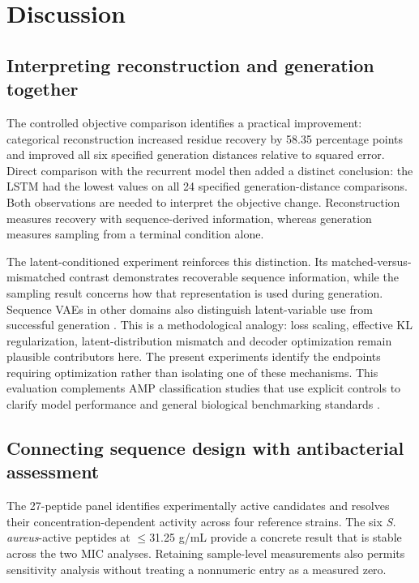\documentclass[unnumsec,webpdf,contemporary,large]{oup-authoring-template}
\begin{document}
\section{Discussion}

\subsection{Interpreting reconstruction and generation together}

The controlled objective comparison identifies a practical improvement: categorical reconstruction increased residue recovery by 58.35 percentage points and improved all six specified generation distances relative to squared error. Direct comparison with the recurrent model then added a distinct conclusion: the LSTM had the lowest values on all 24 specified generation-distance comparisons. Both observations are needed to interpret the objective change. Reconstruction measures recovery with sequence-derived information, whereas generation measures sampling from a terminal condition alone.

The latent-conditioned experiment reinforces this distinction. Its matched-versus-mismatched contrast demonstrates recoverable sequence information, while the sampling result concerns how that representation is used during generation. Sequence VAEs in other domains also distinguish latent-variable use from successful generation \cite{refBowman}. This is a methodological analogy: loss scaling, effective KL regularization, latent-distribution mismatch and decoder optimization remain plausible contributors here. The present experiments identify the endpoints requiring optimization rather than isolating one of these mechanisms. This evaluation complements AMP classification studies that use explicit controls to clarify model performance \cite{ref4,ref5} and general biological benchmarking standards \cite{ref43,ref45}.

\subsection{Connecting sequence design with antibacterial assessment}

The 27-peptide panel identifies experimentally active candidates and resolves their concentration-dependent activity across four reference strains. The six \textit{S. aureus}-active peptides at $\leq$31.25 \textmu{}g/mL provide a concrete result that is stable across the two MIC analyses. Retaining sample-level measurements also permits sensitivity analysis without treating a nonnumeric entry as a measured zero.
\end{document}

